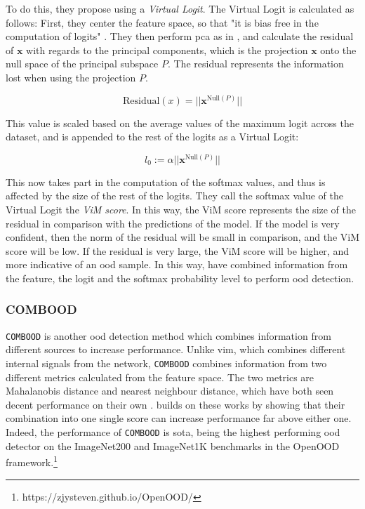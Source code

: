 \documentclass[UKenglish]{uiomasterthesis} %
\theoremstyle{definition}
\begin{document}
To do this, they propose using a {\it Virtual Logit}. The Virtual Logit is calculated as follows: First, they center the feature space, so that "it is bias free in the computation of logits" \cite{vim}. They then perform \ac{pca} as in \cite{subspace}, and calculate the residual of $\bm{x}$ with regards to the principal components, which is the projection $\bm{x}$ onto the null space of the principal subspace $P$. The residual represents the information lost when using the projection $P$.

\begin{equation}
\text{Residual}(x) = || \bm{x}^{\text{Null}(P)}||
\label{virtuallogit}
\end{equation}

\noindent This value is scaled based on the average values of the maximum logit across the dataset, and is appended to the rest of the logits as a Virtual Logit:

\begin{equation}
l_0 := \alpha || \bm{x}^{\text{Null}(P)}||
\label{virtuallogit}
\end{equation}

\noindent This now takes part in the computation of the softmax values, and thus is affected by the size of the rest of the logits. They call the softmax value of the Virtual Logit the {\it ViM score}. In this way, the ViM score represents the size of the residual in comparison with the predictions of the model. If the model is very confident, then the norm of the residual will be small in comparison, and the ViM score will be low. If the residual is very large, the ViM score will be higher, and more indicative of an \ac{ood} sample. In this way, \cite{vim} have combined information from the feature, the logit and the softmax probability level to perform \ac{ood} detection.

\subsubsection{COMBOOD}

\texttt{COMBOOD} \cite{combood} is another \ac{ood} detection method which combines information from different sources to increase performance. Unlike \ac{vim}, which combines different internal signals from the network, \texttt{COMBOOD} combines information from two different metrics calculated from the feature space. The two metrics are Mahalanobis distance and nearest neighbour distance, which have both seen decent performance on their own \cite{nearestneighbour, mahalanobis}. \cite{combood} builds on these works by showing that their combination into one single score can increase performance far above either one. Indeed, the performance of \texttt{COMBOOD} is \acl{sota}, being the highest performing \ac{ood} detector on the ImageNet200 and ImageNet1K benchmarks in the OpenOOD framework.\footnote{https://zjysteven.github.io/OpenOOD/}
\end{document}
